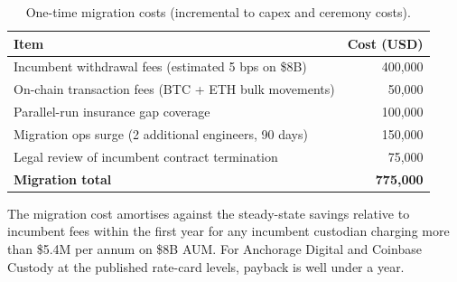 \begin{table}[h]
\centering
\small
\begin{tabular}{lr}
\toprule
\textbf{Item} & \textbf{Cost (USD)} \\
\midrule
Incumbent withdrawal fees (estimated 5 bps on \$8B) & 400{,}000 \\
On-chain transaction fees (BTC + ETH bulk movements) & 50{,}000 \\
Parallel-run insurance gap coverage & 100{,}000 \\
Migration ops surge (2 additional engineers, 90 days) & 150{,}000 \\
Legal review of incumbent contract termination & 75{,}000 \\
\textbf{Migration total} & \textbf{775{,}000} \\
\bottomrule
\end{tabular}
\caption{One-time migration costs (incremental to capex and ceremony
costs).}
\label{tab:migration-cost}
\end{table}

The migration cost amortises against the steady-state savings
relative to incumbent fees within the first year for any incumbent
custodian charging more than \$5.4M per annum on \$8B AUM. For
Anchorage Digital and Coinbase Custody at the published rate-card
levels, payback is well under a year.


